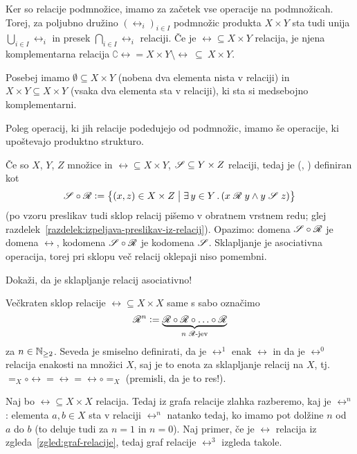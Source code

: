                 Ker so relacije podmnožice, imamo za začetek vse operacije na podmnožicah. Torej, za poljubno družino $(\rel_i)_{i \in I}$ podmnožic produkta $X \times Y$ sta tudi unija $\bigcup_{i \in I} \rel_i$ in presek $\bigcap_{i \in I} \rel_i$ relaciji. Če je $\rel \subseteq X \times Y$ relacija, je njena komplementarna relacija $\complement{\rel} = X \times Y \setminus \rel \ \subseteq \ X \times Y$.

                Posebej imamo  $\emptyset \subseteq X \times Y$ (nobena dva elementa nista v relaciji) in  $X \times Y \subseteq X \times Y$ (vsaka dva elementa sta v relaciji), ki sta si medsebojno komplementarni.

                Poleg operacij, ki jih relacije podedujejo od podmnožic, imamo še operacije, ki upoštevajo produktno strukturo.

                Če so $X$, $Y$, $Z$ množice in $\rel \subseteq X \times Y$, $\srel \subseteq Y \times Z$ relaciji, tedaj je  (, )  definiran kot
                \[\srel \circ \rel \dfeq \set[1]{(x, z) \in X \times Z}{\some{y}[Y]{\rel[x][y] \land \srel[y][z]}}\]
                (po vzoru preslikav tudi sklop relacij pišemo v obratnem vrstnem redu; glej razdelek~\ref{razdelek:izpeljava-preslikav-iz-relacij}). Opazimo: domena $\srel \circ \rel$ je domena $\rel$, kodomena $\srel \circ \rel$ je kodomena $\srel$. Sklapljanje je asociativna operacija, torej pri sklopu več relacij oklepaji niso pomembni.

                \begin{naloga}
                        Dokaži, da je sklapljanje relacij asociativno!
                \end{naloga}

                Večkraten sklop relacije $\rel \subseteq X \times X$ same s sabo označimo
                \[\rel^n \dfeq \underbrace{\rel \circ \rel \circ \ldots \circ \rel}_{\text{$n$ $\rel$-jev}}\]
                za $n \in \mathbb{N}_{\geq 2}$. Seveda je smiselno definirati, da je $\rel^1$ enak $\rel$ in da je $\rel^0$ relacija enakosti na množici $X$, saj je to enota za sklapljanje relacij na $X$, tj.~$=_X \circ \rel = \rel = \rel \circ =_X$ (premisli, da je to res!).

                \begin{zgled}
                        Naj bo $\rel \subseteq X \times X$ relacija. Tedaj iz grafa relacije zlahka razberemo, kaj je $\rel^n$: elementa $a, b \in X$ sta v relaciji $\rel^n$ natanko tedaj, ko imamo pot dolžine $n$ od $a$ do $b$ (to deluje tudi za $n = 1$ in $n = 0$). Naj primer, če je $\rel$ relacija iz zgleda~\ref{zgled:graf-relacije}, tedaj graf relacije $\rel^3$ izgleda takole.

                \end{zgled}

